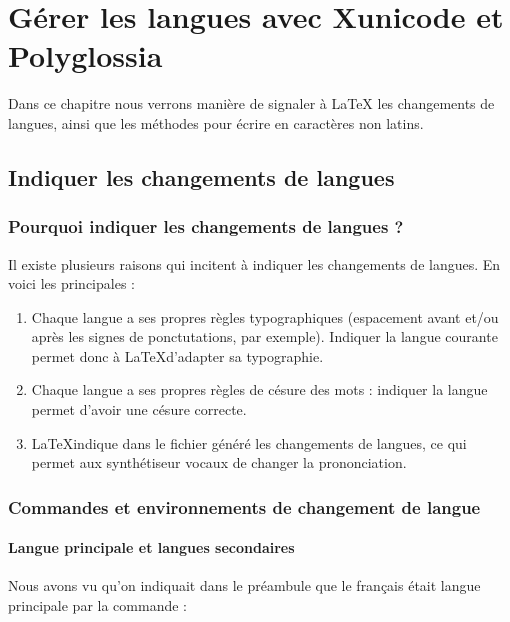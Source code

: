 \chapter{Gérer les langues avec Xunicode et Polyglossia}\label{i18n}

\begin{prealable}
	Dans ce chapitre nous verrons manière de signaler à LaTeX les changements de langues, ainsi que les méthodes pour écrire en caractères non latins.
\end{prealable}

\section{Indiquer les changements de langues}

\subsection{Pourquoi indiquer les changements de langues ?}

Il existe plusieurs raisons qui incitent à indiquer les changements de langues. En voici les principales :
\begin{enumerate}
\item Chaque langue  a ses propres règles typographiques (espacement avant et/ou après les signes de ponctutations, par exemple). Indiquer la langue courante permet donc à \LaTeX d'adapter sa typographie.
\item Chaque langue a ses propres règles de césure des mots : indiquer la langue permet d'avoir une césure correcte.
\item \LaTeX indique dans le fichier généré les changements de  langues, ce qui permet aux synthétiseur vocaux  de changer la prononciation.
\end{enumerate}


\subsection{Commandes et environnements de changement de langue}

\subsubsection{Langue principale et langues secondaires}

Nous avons vu qu'on indiquait dans le préambule que le français était langue principale par la commande : 


